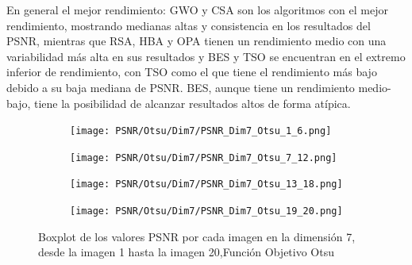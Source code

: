 \documentclass[conference]{IEEEtran}
\begin{document}
\noindent En general el mejor rendimiento: GWO y CSA son los algoritmos con el mejor rendimiento, mostrando medianas altas y consistencia en los resultados del PSNR, mientras que RSA, HBA y OPA tienen un rendimiento medio con una variabilidad más alta en sus resultados y BES y TSO se encuentran en el extremo inferior de rendimiento, con TSO como el que tiene el rendimiento más bajo debido a su baja mediana de PSNR. BES, aunque tiene un rendimiento medio-bajo, tiene la posibilidad de alcanzar resultados altos de forma atípica.
\begin{figure}
	\centering
	\begin{subfigure}{0.4\textwidth}
		\texttt{[image: PSNR/Otsu/Dim7/PSNR\_Dim7\_Otsu\_1\_6.png]}
	\end{subfigure}
	
	\begin{subfigure}{0.4\textwidth}
		\texttt{[image: PSNR/Otsu/Dim7/PSNR\_Dim7\_Otsu\_7\_12.png]}
	\end{subfigure}
	\begin{subfigure}{0.4\textwidth}
		\texttt{[image: PSNR/Otsu/Dim7/PSNR\_Dim7\_Otsu\_13\_18.png]}
	\end{subfigure}
	\begin{subfigure}{0.4\textwidth}
		\texttt{[image: PSNR/Otsu/Dim7/PSNR\_Dim7\_Otsu\_19\_20.png]}
		\vspace{-120pt} %
	\end{subfigure}
	\caption{Boxplot de los valores PSNR por cada imagen en la dimensión 7, desde la imagen 1 hasta la imagen 20,Función Objetivo Otsu}
	\label{fig:imagenes}    
\end{figure}
\end{document}
